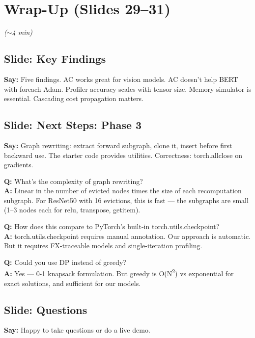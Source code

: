 \documentclass[11pt]{article}
\newcommand{\slide}[1]{\subsection*{Slide: #1}}
\newcommand{\say}[1]{\textbf{Say:} #1}
\newcommand{\qa}[2]{\textcolor{question}{\textbf{Q:} #1} \\ \textbf{A:} #2}
\newcommand{\timing}[1]{\hfill\textcolor{note}{\textit{(#1)}}}
\begin{document}
\section{Wrap-Up (Slides 29--31)} \timing{$\sim$4 min}

\slide{Key Findings}
\say{Five findings. AC works great for vision models. AC doesn't help BERT with foreach Adam. Profiler accuracy scales with tensor size. Memory simulator is essential. Cascading cost propagation matters.}

\slide{Next Steps: Phase 3}
\say{Graph rewriting: extract forward subgraph, clone it, insert before first backward use. The starter code provides utilities. Correctness: torch.allclose on gradients.}

\qa{What's the complexity of graph rewriting?}{Linear in the number of evicted nodes times the size of each recomputation subgraph. For ResNet50 with 16 evictions, this is fast --- the subgraphs are small (1--3 nodes each for relu, transpose, getitem).}

\qa{How does this compare to PyTorch's built-in torch.utils.checkpoint?}{torch.utils.checkpoint requires manual annotation. Our approach is automatic. But it requires FX-traceable models and single-iteration profiling.}

\qa{Could you use DP instead of greedy?}{Yes --- 0-1 knapsack formulation. But greedy is O(N\textsuperscript{2}) vs exponential for exact solutions, and sufficient for our models.}

\slide{Questions}
\say{Happy to take questions or do a live demo.}
\end{document}
